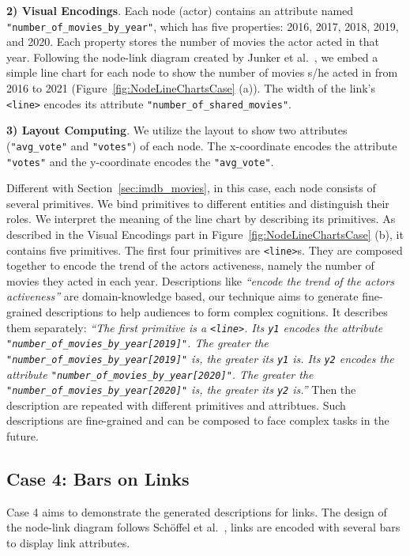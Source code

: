 \textbf{2) Visual Encodings}. 
Each node (actor) contains an attribute named \texttt{"number\_of\_movies\_by\_year"}, which has five properties: 2016, 2017, 2018, 2019, and 2020.
Each property stores the number of movies the actor acted in that year.
Following the node-link diagram created by Junker et al.~\cite{DBLP:journals/bmcbi/JunkerKS06}, 
we embed a simple line chart for each node to show the number of movies s/he acted in from 2016 to 2021 (Figure~\ref{fig:NodeLineChartsCase} (a)). 
The width of the link's \texttt{<line>} encodes its attribute \texttt{"number\_of\_shared\_movies"}.

\textbf{3) Layout Computing}. We utilize the layout to show two attributes (\texttt{"avg\_vote"} and \texttt{"votes"}) of each node. The x-coordinate encodes the attribute \texttt{"votes"} and the y-coordinate encodes the \texttt{"avg\_vote"}.

Different with Section~\ref{sec:imdb_movies}, in this case, each node consists of several primitives.
We bind primitives to different entities and distinguish their roles.
We interpret the meaning of the line chart by describing its primitives.
As described in the Visual Encodings part in Figure~\ref{fig:NodeLineChartsCase} (b), it contains five primitives.
The first four primitives are \texttt{<line>}s.
They are composed together to encode the trend of the actors activeness, namely the number of movies they acted in each year.
Descriptions like \textit{``encode the trend of the actors activeness''} are domain-knowledge based,
our technique aims to generate fine-grained descriptions to help audiences to form complex cognitions.
It describes them separately: 
\textit{``The first primitive is a \texttt{<line>}. 
Its \texttt{y1} encodes the attribute \texttt{"number\_of\_movies\_by\_year[2019]"}. 
The greater the \texttt{"number\_of\_movies\_by\_year[2019]"} is, the greater its \texttt{y1} is. 
Its \texttt{y2} encodes the attribute \texttt{"number\_of\_movies\_by\_year[2020]"}.
The greater the \texttt{"number\_of\_movies\_by\_year[2020]"} is, the greater its \texttt{y2} is.''}
Then the description are repeated with different primitives and attribtues.
Such descriptions are fine-grained and can be composed to face complex tasks in the future.


\subsection{Case 4: Bars on Links}
Case 4 aims to demonstrate the generated descriptions for links.
The design of the node-link diagram follows Sch{\"{o}}ffel et al.~\cite{DBLP:conf/iv/SchoffelSE16}, links are encoded with several bars to display link attributes.

